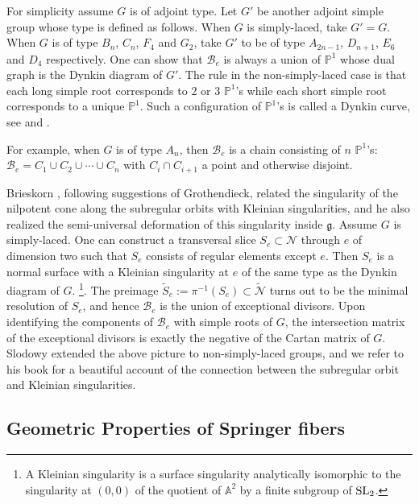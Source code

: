 \documentclass[]{pcmi}
\theoremstyle{plain}
\theoremstyle{definition}
\def\AA{\mathbb{A}}
\def\PP{\mathbb{P}}
\newcommand{\sB}{\ensuremath{\mathscr{B}}\xspace}
\newcommand{\sN}{\ensuremath{\mathscr{N}}\xspace}
\newcommand{\sB}{\ensuremath{\mathcal{B}}\xspace}
\newcommand{\sN}{\ensuremath{\mathcal{N}}\xspace}
\newcommand\frg{\mathfrak{g}}
\newcommand\tilS{\widetilde{S}}
\newcommand\SL{\textup{SL}}
\newcommand{\wt}{\widetilde}
\newcommand{\tN}{\wt{\sN}}
\begin{document}
For simplicity assume $G$ is of adjoint type. Let $G'$ be another adjoint simple group whose type is defined as follows. When $G$ is simply-laced, take $G'=G$. When $G$ is of type $B_{n}$, $C_{n}$, $F_{4}$ and $G_{2}$, take $G'$ to be of type $A_{2n-1}$, $D_{n+1}$, $E_{6}$ and $D_{4}$ respectively. One can show that $\sB_{e}$ is always a union of $\PP^{1}$ whose dual graph is the Dynkin diagram of $G'$. The rule in the non-simply-laced case is that each long simple root corresponds to 2 or 3 $\PP^{1}$'s while each short simple root corresponds to a unique $\PP^{1}$. Such a configuration of $\PP^{1}$'s is called a Dynkin curve, see \cite[\S3.10, Definition and Prop 2]{StConj} and \cite[\S6.3]{Slodowy}.

For example, when $G$ is of type $A_{n}$, then $\sB_{e}$ is a chain consisting of $n$ $\PP^{1}$'s:  $\sB_{e}=C_{1}\cup C_{2}\cup\cdots\cup C_{n}$ with $C_{i}\cap C_{i+1}$ a point and otherwise disjoint.


Brieskorn \cite{Brieskorn}, following suggestions of Grothendieck, related the singularity of the nilpotent cone along the subregular orbits with Kleinian singularities, and he also realized the semi-universal deformation of this singularity inside $\frg$. Assume $G$ is simply-laced. One can construct a transversal slice $S_{e}\subset\sN$ through $e$ of dimension two such that $S_{e}$ consists of regular elements except $e$. Then $S_{e}$ is a normal surface with a Kleinian singularity at $e$ of the same type as the Dynkin diagram of $G$. \footnote{A Kleinian singularity is a surface singularity analytically isomorphic to the singularity at $(0,0)$ of the quotient of $\AA^{2}$ by a finite subgroup of $\SL_{2}$.}.  The preimage $\tilS_{e}:=\pi^{-1}(S_{e})\subset\tN$ turns out to be the minimal resolution of $S_{e}$, and hence $\sB_{e}$ is the union of exceptional divisors. Upon identifying the components of $\sB_{e}$ with simple roots of $G$, the intersection matrix of the exceptional divisors is exactly the negative of the Cartan matrix of $G$. Slodowy \cite{Slodowy} extended the above picture to non-simply-laced groups, and we refer to his book \cite{Slodowy} for a beautiful account of the connection between the subregular orbit and Kleinian singularities. 



\subsection{Geometric Properties of Springer fibers}
\end{document}
